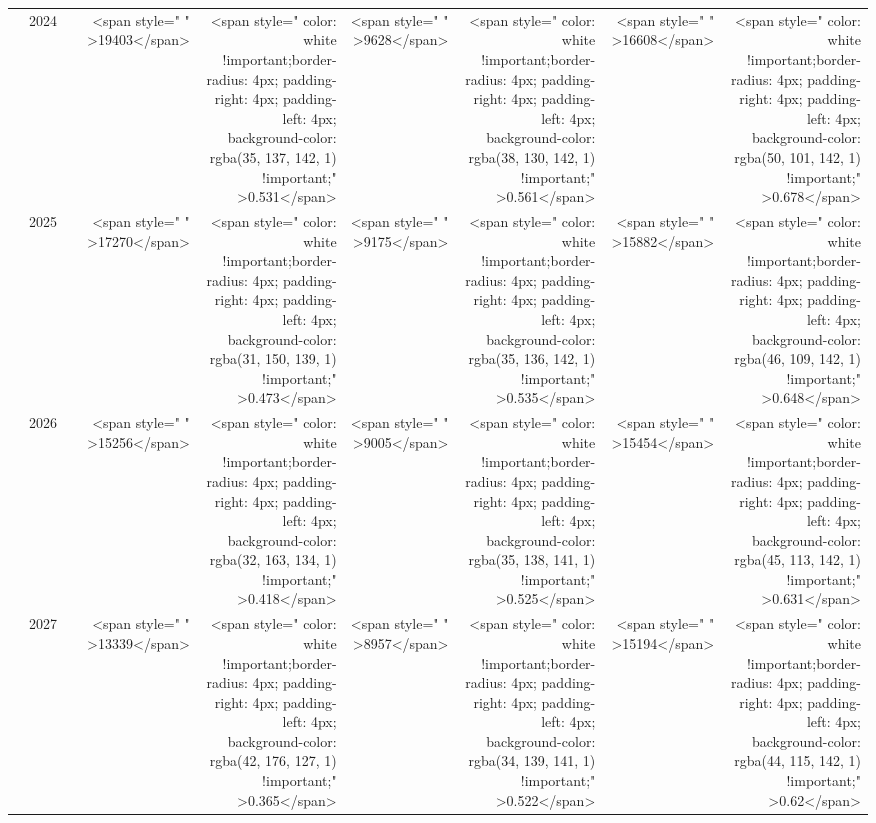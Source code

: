 \begin{table}
\begin{tabular}[t]{>{}l|l>{}rr>{}r|rrrr}
 & 2024 & \cellcolor[HTML]{6B6C71}{\textcolor{white}{3418}} & <span style="     " >19403</span> & <span style="     color: white !important;border-radius: 4px; padding-right: 4px; padding-left: 4px; background-color: rgba(35, 137, 142, 1) !important;" >0.531</span> & <span style="     " >9628</span> & <span style="     color: white !important;border-radius: 4px; padding-right: 4px; padding-left: 4px; background-color: rgba(38, 130, 142, 1) !important;" >0.561</span> & <span style="     " >16608</span> & <span style="     color: white !important;border-radius: 4px; padding-right: 4px; padding-left: 4px; background-color: rgba(50, 101, 142, 1) !important;" >0.678</span>\\

 & 2025 & \cellcolor[HTML]{707173}{\textcolor{white}{3246}} & <span style="     " >17270</span> & <span style="     color: white !important;border-radius: 4px; padding-right: 4px; padding-left: 4px; background-color: rgba(31, 150, 139, 1) !important;" >0.473</span> & <span style="     " >9175</span> & <span style="     color: white !important;border-radius: 4px; padding-right: 4px; padding-left: 4px; background-color: rgba(35, 136, 142, 1) !important;" >0.535</span> & <span style="     " >15882</span> & <span style="     color: white !important;border-radius: 4px; padding-right: 4px; padding-left: 4px; background-color: rgba(46, 109, 142, 1) !important;" >0.648</span>\\

 & 2026 & \cellcolor[HTML]{727274}{\textcolor{white}{3165}} & <span style="     " >15256</span> & <span style="     color: white !important;border-radius: 4px; padding-right: 4px; padding-left: 4px; background-color: rgba(32, 163, 134, 1) !important;" >0.418</span> & <span style="     " >9005</span> & <span style="     color: white !important;border-radius: 4px; padding-right: 4px; padding-left: 4px; background-color: rgba(35, 138, 141, 1) !important;" >0.525</span> & <span style="     " >15454</span> & <span style="     color: white !important;border-radius: 4px; padding-right: 4px; padding-left: 4px; background-color: rgba(45, 113, 142, 1) !important;" >0.631</span>\\

 & 2027 & \cellcolor[HTML]{737475}{\textcolor{white}{3117}} & <span style="     " >13339</span> & <span style="     color: white !important;border-radius: 4px; padding-right: 4px; padding-left: 4px; background-color: rgba(42, 176, 127, 1) !important;" >0.365</span> & <span style="     " >8957</span> & <span style="     color: white !important;border-radius: 4px; padding-right: 4px; padding-left: 4px; background-color: rgba(34, 139, 141, 1) !important;" >0.522</span> & <span style="     " >15194</span> & <span style="     color: white !important;border-radius: 4px; padding-right: 4px; padding-left: 4px; background-color: rgba(44, 115, 142, 1) !important;" >0.62</span>\\


\end{tabular}
\end{table}
